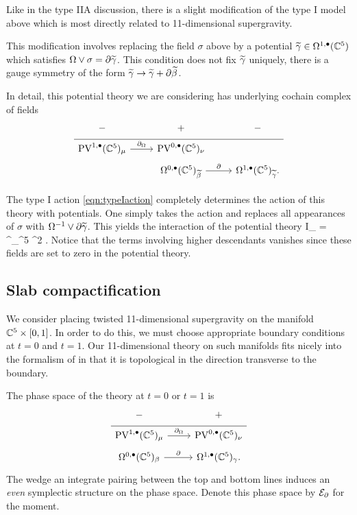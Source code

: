 Like in the type IIA discussion, there is a slight modification of the type I model above which is most directly related to 11-dimensional supergravity. 

This modification involves replacing the field $\sigma$ above by a potential $\widetilde \gamma \in \Omega^{1,\bullet}(\mathbb C^5)$ which satisfies $\Omega \vee \sigma = \partial \widetilde \gamma$. 
This condition does not fix $\widetilde \gamma$ uniquely, there is a gauge symmetry of the form $\widetilde \gamma \to \widetilde \gamma + \partial \widetilde \beta$. 

In detail, this potential theory we are considering has underlying cochain complex of fields
\begin{equation}
  \label{eq:Ipot} 
  \begin{tikzcd}[row sep = 1 ex]
    - & + & -\\ \hline
    \PV^{1,\bu}(\CC^5)_\mu \ar[r, "\div"] & \PV^{0,\bu}(\CC^5)_\nu  \\
         & \Omega^{0,\bu}(\CC^5)_{\til\beta} \ar[r, "\del"] & \Omega^{1,\bu}(\CC^5)_{\til\gamma} .
\end{tikzcd}
\end{equation} 

The type I action \eqref{eqn:typeIaction} completely determines the action of this theory with potentials. 
One simply takes the action and replaces all appearances of $\sigma$ with $\Omega^{-1} \vee \partial \widetilde\gamma$. 
This yields the interaction of the potential theory
\beqn\label{eqn:Iactionpot}
\til I_{} =  \int^\Omega_{\CC^5}  \mu^2 \vee \del \til\gamma .
\eeqn
Notice that the terms involving higher descendants vanishes since these fields are set to zero in the potential theory.

\subsection{Slab compactification} 

We consider placing twisted 11-dimensional supergravity on the manifold $\mathbb C^5 \times [0,1]$. 
In order to do this, we must choose appropriate boundary conditions at $t=0$ and $t=1$.
Our 11-dimensional theory on such manifolds fits nicely into the formalism of \cite{BY,Eugene} in that it is topological in the direction transverse to the boundary.  

The phase space of the theory at $t=0$ or $t=1$ is 
\begin{equation}
  \label{eq:lin1} 
  \begin{tikzcd}[row sep = 1 ex]
    - & + \\ \hline
    \PV^{1,\bu}(\CC^5)_\mu \ar[r, "\div"] & \PV^{0,\bu}(\CC^5)_\nu \\ 
     \Omega^{0,\bu}(\CC^5)_\beta \ar[r, "\del"] & \Omega^{1,\bu}(\CC^5)_\gamma.
\end{tikzcd}
\end{equation}
The wedge an integrate pairing between the top and bottom lines induces an {\em even} symplectic structure on the phase space. 
Denote this phase space by $\mathcal E_{\partial}$ for the moment.

